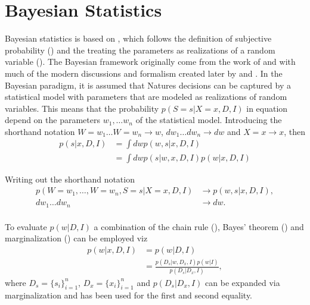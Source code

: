\section{Bayesian Statistics}
Bayesian statistics is based on , which follows the definition of subjective probability () and the treating the parameters as realizations of a random variable (). The Bayesian framework originally come from the work of \citet{Bayes:63} and \citet{laplace_thorie_1812} with much of the modern discussions and formalism created later by \citet{Finetti1937LaP,Jeffreys1940} and \citet{Savage1954}.\newline
In the Bayesian paradigm, it is assumed that Natures decisions can be captured by a statistical model with parameters that are modeled as realizations of random variables. This means that the probability $p(S=s|X=x,D,I)$ in equation  depend on the parameters $w_1,\dots w_n$ of the statistical model. Introducing the shorthand notation $W=w_1\dots W=w_n \rightarrow w$, $dw_1\dots dw_n \rightarrow dw$ and $X=x \rightarrow x$, then
\begin{equation}
	\begin{split}
		p(s|x,D,I) &= \int dw p(w,s|x,D,I)\\
		& = \int dw p(s|w,x,D,I)p(w|x,D,I)
	\end{split}
	\label{eq:hest1}
\end{equation}
\begin{example}
	Writing out the shorthand notation
	\begin{equation}
		\begin{split}
			p(W=w_1,\dots,W= w_n,S = s|X = x,D,I)&\rightarrow p(w,s|x,D,I),\\
			dw_1\dots dw_n &\rightarrow dw.\\
		\end{split}
	\end{equation}
\end{example}

To evaluate $p(w|D,I)$ a combination of the chain rule (), Bayes' theorem () and marginalization () can be employed viz
\begin{equation}
	\begin{split}
		p(w|x,D,I) &= p(w|D,I)\\
		&= \frac{p(D_s|w,D_x,I)p(w|I)}{p(D_s|D_x,I)},
	\end{split}
	\label{eq:pa2}
\end{equation}
where $D_s= \{s_i\}_{i=1}^n$, $D_x = \{x_i\}_{i=1}^n$ and $p(D_s|D_x,I)$ can be expanded via marginalization and  has been used for the first and second equality.

